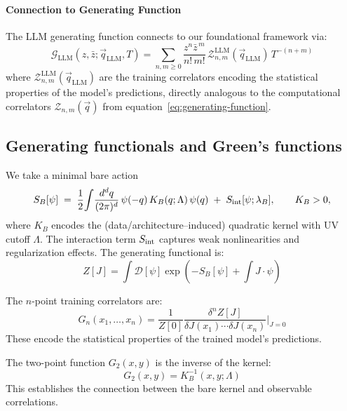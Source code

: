 \paragraph{Connection to Generating Function}
The LLM generating function connects to our foundational framework via:
\begin{equation}
\mathcal{G}_{\text{LLM}}(z, \bar{z}; \vec{q}_{\text{LLM}}, T) = \sum_{n,m\ge0}\frac{z^n\bar{z}^{\,m}}{n!\,m!}\,\mathcal{Z}_{n,m}^{\text{LLM}}(\vec{q}_{\text{LLM}})\,T^{-(n+m)} \label{eq:llm-generating-function}
\end{equation}
where $\mathcal{Z}_{n,m}^{\text{LLM}}(\vec{q}_{\text{LLM}})$ are the training correlators encoding the statistical properties of the model's predictions, directly analogous to the computational correlators $\mathcal{Z}_{n,m}(\vec{q})$ from equation~\eqref{eq:generating-function}.

\subsection{Generating functionals and Green's functions}
\label{sec:ZJ}

We take a minimal bare action
\begin{equation}
  S_B[\psi] \;=\;
  \frac{1}{2}\!\int\!\frac{d^d q}{(2\pi)^d}\, \psi(-q)\,K_B(q;\Lambda)\,\psi(q)
  \;+\; S_{\rm int}[\psi;\lambda_B],
  \qquad K_B>0,
  \label{eq:bare_action}
\end{equation}
where $K_B$ encodes the (data/architecture–induced) quadratic kernel with UV
cutoff $\Lambda$. The interaction term $S_{\rm int}$ captures weak nonlinearities
and regularization effects. The generating functional is:
\begin{equation}
  Z[J] = \int \mathcal{D}[\psi] \exp\left(-S_B[\psi] + \int J \cdot \psi\right)
  \label{eq:generating_functional}
\end{equation}

\begin{definition}
\label{def:training-correlators}
The $n$-point training correlators are:
\begin{equation}
  G_n(x_1,\ldots,x_n) = \frac{1}{Z[0]} \frac{\delta^n Z[J]}{\delta J(x_1) \cdots \delta J(x_n)} \bigg|_{J=0}
  \label{eq:n_point_correlator}
\end{equation}
These encode the statistical properties of the trained model's predictions.
\end{definition}

\begin{proposition}
\label{prop:two_point_kernel}
The two-point function $G_2(x,y)$ is the inverse of the kernel:
\begin{equation}
  G_2(x,y) = K_B^{-1}(x,y;\Lambda)
  \label{eq:two_point_inverse}
\end{equation}
This establishes the connection between the bare kernel and observable correlations.
\end{proposition}

